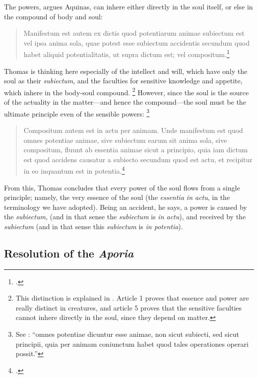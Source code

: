 The powers, argues Aquinas, can inhere either directly in the soul itself, or else in the compound of body and soul:
%
\begin{quotation}
Manifestum est autem ex dictis quod potentiarum animae subiectum est vel ipsa anima sola, quae potest esse subiectum accidentis secundum quod habet aliquid potentialitatis, ut supra dictum est; vel compositum.\footcite[I, q.~77, a.~6, co.]{st:summa}
\end{quotation}
%
Thomas is thinking here especially of the intellect and will, which have only the soul as their \emph{subiectum}, and the faculties for sensitive knowledge and appetite, which inhere in the body-soul compound.%
%
\footnote{This distinction is explained in \cite[I, q.~77, a.~1 and 5]{st:summa}. Article 1 proves that essence and power are really distinct in creatures, and article 5 proves that the sensitive faculties cannot inhere directly in the soul, since they depend on matter.} However, since the soul is the source of the actuality in the matter—and hence the compound—the soul must be the  ultimate principle even of the sensible powers:%
%
\footnote{See \cite[I, q.~77, a.~5, ad~1]{st:summa}: “omnes potentiae dicuntur esse animae, non sicut subiecti, sed sicut principii, quia per animam coniunctum habet quod tales operationes operari possit.”}
%
\begin{quotation}
Compositum autem est in actu per animam. Unde manifestum est quod omnes potentiae animae, sive subiectum earum sit anima sola, sive compositum, fluunt ab essentia animae sicut a principio, quia iam dictum est quod accidens causatur a subiecto secundum quod est actu, et recipitur in eo inquantum est in potentia.\footcite[I, q.~77, a.~6, co.]{st:summa}
\end{quotation}
%
From this, Thomas concludes that every power of the soul flows from a single principle; namely, the very essence of the soul (the \emph{essentia in actu}, in the terminology we have adopted). Being an accident, he says, a power is caused by the \emph{subiectum}, (and in that sense the \emph{subiectum} is \emph{in actu}), and received by the \emph{subiectum} (and in that sense this \emph{subiectum} is \emph{in potentia}).

\subsection{Resolution of the \emph{Aporia}}

